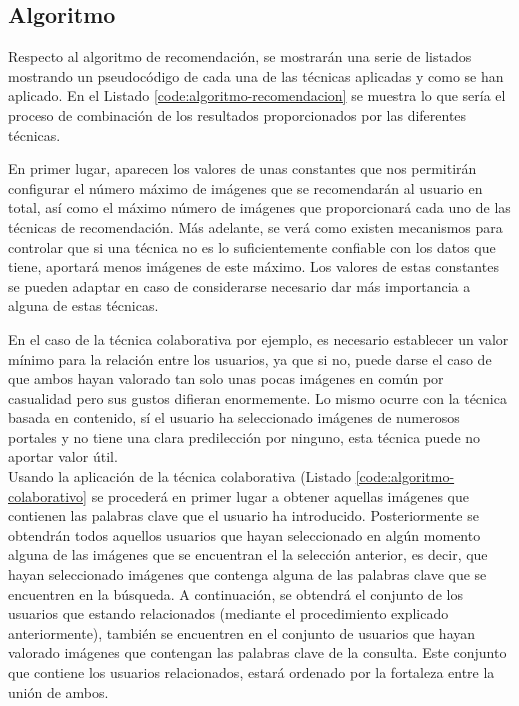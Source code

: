 \subsection{Algoritmo}

Respecto al algoritmo de recomendación, se mostrarán una serie de listados mostrando un pseudocódigo de cada una de las técnicas aplicadas y como se han aplicado. En el Listado \ref{code:algoritmo-recomendacion} se muestra lo que sería el proceso de combinación de los resultados proporcionados por las diferentes técnicas. 

En primer lugar, aparecen los valores de unas constantes que nos permitirán configurar el número máximo de imágenes que se recomendarán al usuario en total, así como el máximo número de imágenes que proporcionará cada uno de las técnicas de recomendación. Más adelante, se verá como existen mecanismos para controlar que si una técnica no es lo suficientemente confiable con los datos que tiene, aportará menos imágenes de este máximo. Los valores de estas constantes se pueden adaptar en caso de considerarse necesario dar más importancia a alguna de estas técnicas.

En el caso de la técnica colaborativa por ejemplo, es necesario establecer un valor mínimo para la relación entre los usuarios, ya que si no, puede darse el caso de que ambos hayan valorado tan solo unas pocas imágenes en común por casualidad pero sus gustos difieran enormemente. Lo mismo ocurre con la técnica basada en contenido, sí el usuario ha seleccionado imágenes de numerosos portales y no tiene una clara predilección por ninguno, esta técnica puede no aportar valor útil.\\



Usando la aplicación de la técnica colaborativa (Listado \ref{code:algoritmo-colaborativo} se procederá en primer lugar a obtener aquellas imágenes que contienen las palabras clave que el usuario ha introducido. Posteriormente se obtendrán todos aquellos usuarios que hayan seleccionado en algún momento alguna de las  imágenes que se encuentran el la selección anterior, es decir, que hayan seleccionado imágenes que contenga alguna de las palabras clave que se encuentren en la búsqueda. A continuación, se obtendrá el conjunto de los usuarios que estando relacionados (mediante el procedimiento explicado anteriormente), también se encuentren en el conjunto de usuarios que hayan valorado imágenes que contengan las palabras clave de la consulta. Este conjunto que contiene los usuarios relacionados, estará ordenado por la fortaleza entre la unión de ambos.

